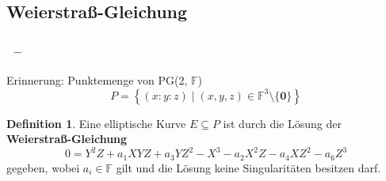 \documentclass{beamer}
\theoremstyle{plain}
\theoremstyle{definition}
\newtheorem{defn}[thm]{Definition}
\theoremstyle{rem}
\newcommand{\pgtwo}{PG(2, $\mathbb{F}$)\ }
\newcommand{\ftnz}{\mathbb{F}^{3}\setminus\{\boldsymbol 0\}}
\begin{document}
\subsection{Weierstraß-Gleichung}

\begin{frame}
\frametitle{\insertsection~--~\insertsubsection}
Erinnerung: Punktemenge von \pgtwo
\begin{equation*}
    P = \left\{(x:y:z) \mid (x,y,z) \in \ftnz \right\}
\end{equation*}
\begin{defn}
Eine elliptische Kurve $E\subseteq P$ ist durch die Lösung der \textbf{Weierstraß-Gleichung} 
    \begin{equation*}
        0=Y^2Z + a_1XYZ + a_3YZ^2 - X^3 - a_2X^2Z - a_4XZ^2 - a_6Z^3
    \end{equation*}
    gegeben, wobei $a_i \in \mathbb{F}$ gilt und die Lösung keine Singularitäten besitzen darf.
\end{defn}
\end{frame}

\end{document}
